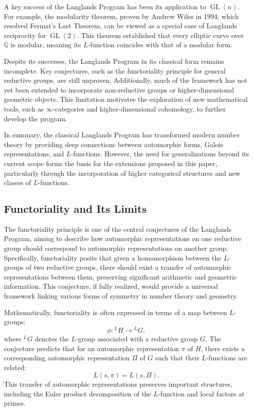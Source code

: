 \documentclass{article}
\theoremstyle{remark}
\begin{document}
A key success of the Langlands Program has been its application to $\operatorname{GL}(n)$. For example, the modularity theorem, proven by Andrew Wiles in 1994, which resolved Fermat’s Last Theorem, can be viewed as a special case of Langlands reciprocity for $\operatorname{GL}(2)$. This theorem established that every elliptic curve over $\mathbb{Q}$ is modular, meaning its $L$-function coincides with that of a modular form.

Despite its successes, the Langlands Program in its classical form remains incomplete. Key conjectures, such as the functoriality principle for general reductive groups, are still unproven. Additionally, much of the framework has not yet been extended to incorporate non-reductive groups or higher-dimensional geometric objects. This limitation motivates the exploration of new mathematical tools, such as $\infty$-categories and higher-dimensional cohomology, to further develop the program.

In summary, the classical Langlands Program has transformed modern number theory by providing deep connections between automorphic forms, Galois representations, and $L$-functions. However, the need for generalizations beyond its current scope forms the basis for the extensions proposed in this paper, particularly through the incorporation of higher categorical structures and new classes of $L$-functions.

\subsection{Functoriality and Its Limits}

The functoriality principle is one of the central conjectures of the Langlands Program, aiming to describe how automorphic representations on one reductive group should correspond to automorphic representations on another group. Specifically, functoriality posits that given a homomorphism between the $L$-groups of two reductive groups, there should exist a transfer of automorphic representations between them, preserving significant arithmetic and geometric information. This conjecture, if fully realized, would provide a universal framework linking various forms of symmetry in number theory and geometry.

Mathematically, functoriality is often expressed in terms of a map between $L$-groups:
\[
\phi: {}^L H \to {}^L G,
\]
where ${}^L G$ denotes the $L$-group associated with a reductive group $G$. The conjecture predicts that for an automorphic representation $\pi$ of $H$, there exists a corresponding automorphic representation $\Pi$ of $G$ such that their $L$-functions are related:
\[
L(s, \pi) = L(s, \Pi).
\]
This transfer of automorphic representations preserves important structures, including the Euler product decomposition of the $L$-function and local factors at primes.
\end{document}
